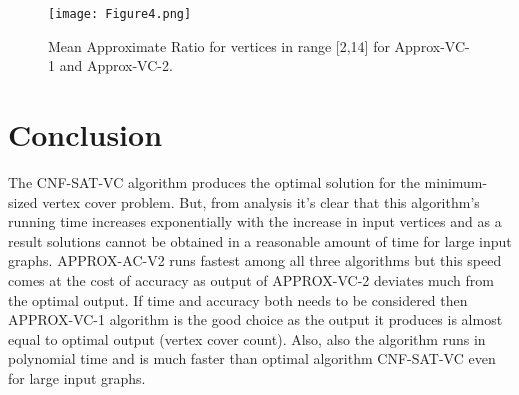 \documentclass{article}
\begin{document}
\begin{figure}[H]
\centering
\texttt{[image: Figure4.png]}
\caption{\label{fig:figure2}Mean Approximate Ratio for vertices in range [2,14] for Approx-VC-1 and Approx-VC-2.}
\end{figure}



\section{Conclusion}

The CNF-SAT-VC algorithm produces the optimal solution for the minimum-sized vertex cover problem. But, from analysis it's clear that this algorithm's running time increases exponentially with the increase in input vertices and as a result solutions cannot be obtained in a reasonable amount of time for large input graphs. APPROX-AC-V2 runs fastest among all three algorithms but this speed comes at the cost of accuracy as output of APPROX-VC-2 deviates much from the optimal output. If time and accuracy both needs to be considered then APPROX-VC-1 algorithm is the good choice as the output it produces is almost equal to optimal output (vertex cover count). Also, also the algorithm runs in polynomial time and is much faster than optimal algorithm CNF-SAT-VC even for large input graphs.
\end{document}
